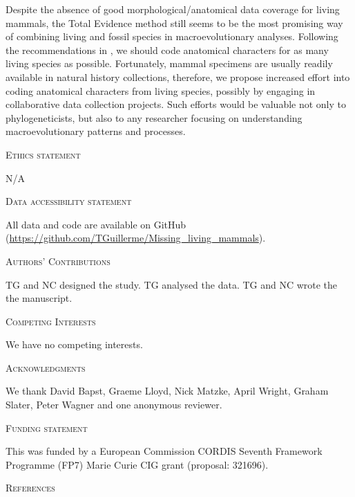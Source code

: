\documentclass[12pt,letterpaper]{article}
\renewcommand{\section}[1]{%
\bigskip
\begin{center}
\begin{Large}
\normalfont\scshape #1
\medskip
\end{Large}
\end{center}}
\begin{document}
Despite the absence of good morphological/anatomical data coverage for living mammals, the Total Evidence method still seems to be the most promising way of combining living and fossil species in macroevolutionary analyses.
Following the recommendations in \cite{GuillermeCooper}, we should code anatomical characters for as many living species as possible. 
Fortunately, mammal specimens are usually readily available in natural history collections, therefore, we propose increased effort into coding anatomical characters from living species, possibly by engaging in collaborative data collection projects.
Such efforts would be valuable not only to phylogeneticists, but also to any researcher focusing on understanding macroevolutionary patterns and processes.

\section{Ethics statement}
N/A
\section{Data accessibility statement}
All data and code are available on GitHub (\url{https://github.com/TGuillerme/Missing_living_mammals}).
\section{Authors' Contributions}
TG and NC designed the study. TG analysed the data. TG and NC wrote the the manuscript.
\section{Competing Interests}
We have no competing interests.
\section{Acknowledgments}
We thank David Bapst, Graeme Lloyd, Nick Matzke, April Wright, Graham Slater, Peter Wagner and one anonymous reviewer.
\section{Funding statement}
This was funded by a European Commission CORDIS Seventh Framework Programme (FP7) Marie Curie CIG grant (proposal: 321696).

\section{References}








\end{document}
